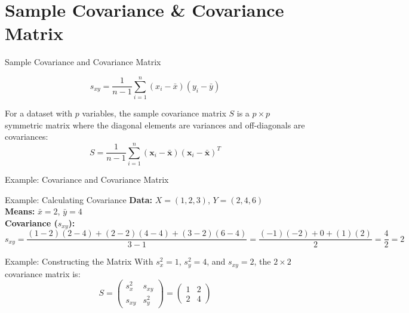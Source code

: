 \documentclass[10pt, aspectratio=169]{beamer}
\begin{document}
\section{Sample Covariance \& Covariance Matrix}

\begin{frame}{Sample Covariance and Covariance Matrix}
    \begin{definition}
        $$s_{xy} = \frac{1}{n-1} \sum_{i=1}^{n} (x_i - \bar{x})(y_i - \bar{y})$$
    \end{definition}

    \begin{definition}
        For a dataset with $p$ variables, the sample covariance matrix $S$ is a $p \times p$ symmetric matrix where the diagonal elements are variances and off-diagonals are covariances:
        $$S = \frac{1}{n-1} \sum_{i=1}^{n} (\mathbf{x}_i - \bar{\mathbf{x}})(\mathbf{x}_i - \bar{\mathbf{x}})^T$$
    \end{definition}
\end{frame}

\begin{frame}{Example: Covariance and Covariance Matrix}
    \begin{exampleblock}{Example: Calculating Covariance}
        \textbf{Data:} $X = (1, 2, 3)$, $Y = (2, 4, 6)$ \\
        \textbf{Means:} $\bar{x} = 2$, $\bar{y} = 4$ \\
        \textbf{Covariance ($s_{xy}$):}
        $$s_{xy} = \frac{(1-2)(2-4) + (2-2)(4-4) + (3-2)(6-4)}{3-1} = \frac{(-1)(-2) + 0 + (1)(2)}{2} = \frac{4}{2} = 2$$
    \end{exampleblock}

    \begin{exampleblock}{Example: Constructing the Matrix}
        With $s_x^2 = 1$, $s_y^2 = 4$, and $s_{xy} = 2$, the $2 \times 2$ covariance matrix is:
        $$S = \begin{pmatrix} s_x^2 & s_{xy} \\ s_{xy} & s_y^2 \end{pmatrix} = \begin{pmatrix} 1 & 2 \\ 2 & 4 \end{pmatrix}$$
    \end{exampleblock}
\end{frame}
\end{document}
